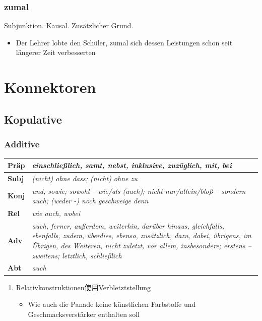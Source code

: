 \documentclass[UTF8]{report}
\begin{document}
\subsection{zumal}
Subjunktion. Kausal. Zusätzlicher Grund.
\begin{itemize}
    \item Der Lehrer lobte den Schüler, zumal sich dessen Leistungen schon seit längerer Zeit verbesserten
\end{itemize}

\chapter{Konnektoren}
\section{Kopulative}
\subsection{Additive}
\begin{longtable}{|>{\raggedright\arraybackslash}p{1cm}|>{\raggedright\arraybackslash}p{12cm}|}

\hline
\textbf{Präp} & \textit{einschließlich, samt, nebst, inklusive, zuzüglich, mit, bei} \\
\hline
\textbf{Subj} & \textit{(nicht) ohne dass; (nicht) ohne zu} \\
\hline
\textbf{Konj} & \textit{und; sowie; sowohl -- wie/als (auch); nicht nur/allein/bloß -- sondern auch; (weder -) noch geschweige denn} \\
\hline
\textbf{Rel} & \textit{wie auch, wobei} \\
\hline
\textbf{Adv} & \textit{auch, ferner, außerdem, weiterhin, darüber hinaus, gleichfalls, ebenfalls, zudem, überdies, ebenso, zusätzlich, dazu, dabei, übrigens, im Übrigen, des Weiteren, nicht zuletzt, vor allem, insbesondere; erstens -- zweitens; letztlich, schließlich} \\
\hline
\textbf{Abt} & \textit{auch} \\
\hline
\end{longtable}

\begin{enumerate}
    \item Relativkonstruktionen使用Verbletztstellung
    \begin{itemize}
        \item Wie auch die Panade keine künstlichen Farbstoffe und Geschmacksverstärker enthalten soll
    \end{itemize}
\end{enumerate}
\end{document}
